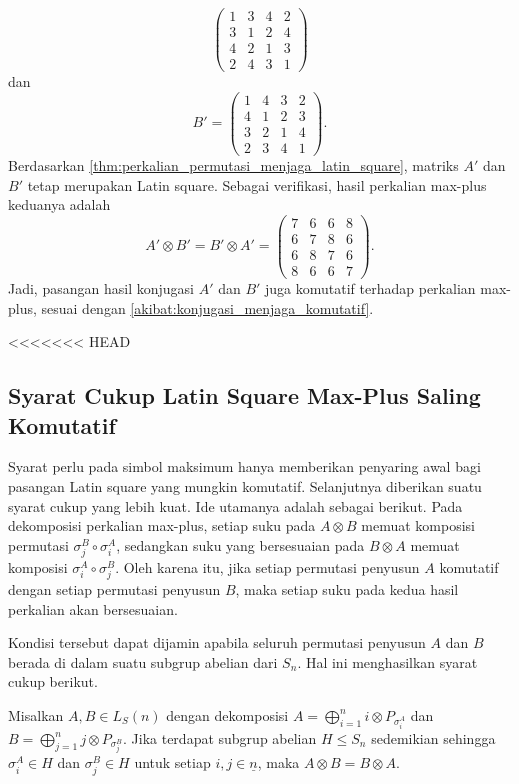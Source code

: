 \begin{contoh}
\[\begin{pmatrix}
      1 & 3 & 4 & 2 \\
      3 & 1 & 2 & 4 \\
      4 & 2 & 1 & 3 \\
      2 & 4 & 3 & 1
    \end{pmatrix}
  \]
  dan
  \[
    B'=
    \begin{pmatrix}
      1 & 4 & 3 & 2 \\
      4 & 1 & 2 & 3 \\
      3 & 2 & 1 & 4 \\
      2 & 3 & 4 & 1
    \end{pmatrix}.
  \]
  Berdasarkan \autoref{thm:perkalian_permutasi_menjaga_latin_square},
  matriks $A'$ dan $B'$ tetap merupakan Latin square. Sebagai verifikasi, hasil perkalian max-plus keduanya adalah
  \[
    A'\otimes B'
    =
    B'\otimes A'
    =
    \begin{pmatrix}
      7 & 6 & 6 & 8 \\
      6 & 7 & 8 & 6 \\
      6 & 8 & 7 & 6 \\
      8 & 6 & 6 & 7
    \end{pmatrix}.
  \]
  Jadi, pasangan hasil konjugasi $A'$ dan $B'$ juga komutatif terhadap
  perkalian max-plus, sesuai dengan
  \autoref{akibat:konjugasi_menjaga_komutatif}.
\end{contoh}

<<<<<<< HEAD
\subsection{Syarat Cukup Latin Square Max-Plus Saling Komutatif}
Syarat perlu pada simbol maksimum hanya memberikan penyaring awal bagi pasangan Latin square yang mungkin komutatif. Selanjutnya diberikan suatu syarat cukup yang lebih kuat. Ide utamanya adalah sebagai berikut. Pada dekomposisi perkalian max-plus, setiap suku pada $A\otimes B$ memuat komposisi permutasi $\sigma_j^B\circ\sigma_i^A$, sedangkan suku yang bersesuaian pada $B\otimes A$ memuat komposisi $\sigma_i^A\circ\sigma_j^B$. Oleh karena itu, jika setiap permutasi penyusun $A$ komutatif dengan setiap permutasi penyusun $B$, maka setiap suku pada kedua hasil perkalian akan bersesuaian.

Kondisi tersebut dapat dijamin apabila seluruh permutasi penyusun $A$ dan $B$ berada di dalam suatu subgrup abelian dari $S_n$. Hal ini menghasilkan syarat cukup berikut.
\begin{teorema}\label{thm:syarat_cukup_subgrup_abelian}
  Misalkan $A,B\in L_S(n)$ dengan dekomposisi
  $A=\bigoplus_{i=1}^{n} i\otimes P_{\sigma_i^A}$ dan
  $B=\bigoplus_{j=1}^{n} j\otimes P_{\sigma_j^B}$.
  Jika terdapat subgrup abelian $H\le S_n$ sedemikian sehingga
  $\sigma_i^A\in H$ dan $\sigma_j^B\in H$ untuk setiap $i,j\in \underline{n}$, maka
  $A\otimes B=B\otimes A$.
\end{teorema}

